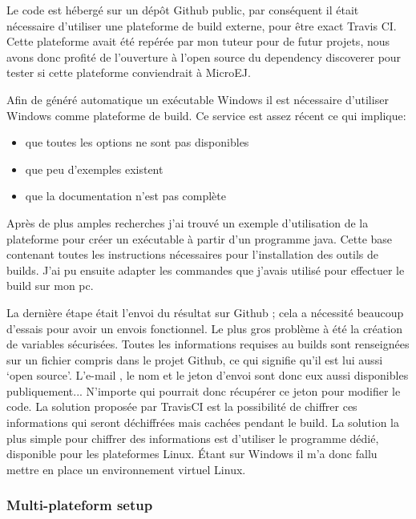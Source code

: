 \documentclass[french,a4paper,12pt]{report}
\begin{document}
Le code est hébergé sur un dépôt Github public, par conséquent il était nécessaire d’utiliser une plateforme de build externe, pour être exact Travis CI. Cette plateforme avait été repérée par mon tuteur pour de futur projets, nous avons donc profité de l'ouverture à l'open source du dependency discoverer pour tester si cette plateforme conviendrait à MicroEJ.

Afin de généré automatique un exécutable Windows il est nécessaire d’utiliser Windows comme plateforme de build. Ce service est assez récent ce qui implique:

\begin{itemize}

 \item que toutes les options ne sont pas disponibles
 \item que peu d’exemples existent
 \item que la documentation n’est pas complète

\end{itemize}

Après de plus amples recherches j’ai trouvé un exemple d’utilisation de la plateforme pour créer un exécutable à partir d’un programme java. Cette base contenant toutes les instructions nécessaires pour l’installation des outils de builds. J’ai pu ensuite adapter les commandes que j’avais utilisé pour effectuer le build sur mon pc. 

La dernière étape était l’envoi du résultat sur Github ; cela a nécessité beaucoup d'essais pour avoir un envois fonctionnel. Le plus gros problème à été la création de variables sécurisées. Toutes les informations requises au builds sont renseignées sur un fichier compris dans le projet Github, ce qui signifie qu’il est lui aussi ‘open source’. L’e-mail , le nom et le jeton d’envoi sont donc eux aussi disponibles publiquement... N’importe qui pourrait donc récupérer ce jeton pour modifier le code. La solution proposée par TravisCI est la possibilité de chiffrer ces informations qui seront déchiffrées mais cachées pendant le build. La solution la plus simple pour chiffrer des informations est d’utiliser le programme dédié, disponible pour les plateformes Linux. Étant sur Windows il m’a donc fallu mettre en place un environnement virtuel Linux.

\subsubsection{Multi-plateform setup}
\end{document}
